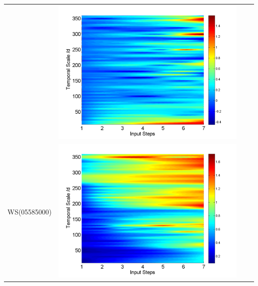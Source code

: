 \documentclass[review]{elsarticle}
\begin{document}
\begin{table}[H]
\begin{tabular}{cccc}
&\begin{minipage}{.3\textwidth}\includegraphics[width=\linewidth]{resultgraph/02143000diff_q.png}\end{minipage}
\\
WS(05585000)
&\begin{minipage}{.3\textwidth}\includegraphics[width=\linewidth]{resultgraph/05585000p.png}\end{minipage}

\end{tabular}
\end{table}
\end{document}
